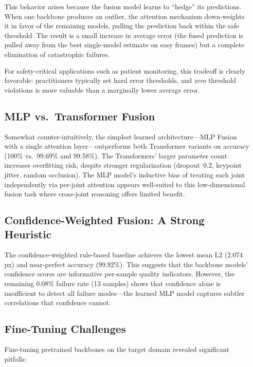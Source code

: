\documentclass[11pt,a4paper]{article}
\begin{document}
This behavior arises because the fusion model learns to ``hedge'' its
predictions.  When one backbone produces an outlier, the attention mechanism
down-weights it in favor of the remaining models, pulling the prediction back
within the safe threshold.  The result is a small increase in average error
(the fused prediction is pulled away from the best single-model estimate on
easy frames) but a complete elimination of catastrophic failures.

For safety-critical applications such as patient monitoring, this tradeoff is
clearly favorable: practitioners typically set hard error thresholds, and
\emph{zero} threshold violations is more valuable than a marginally lower
average error.

\subsection{MLP vs.\ Transformer Fusion}

Somewhat counter-intuitively, the simplest learned architecture---MLP
Fusion with a single attention layer---outperforms both Transformer variants
on accuracy (100\% vs.\ 99.69\% and 99.58\%).  The Transformers' larger
parameter count increases overfitting risk, despite stronger regularization
(dropout~0.2, keypoint jitter, random occlusion).  The MLP model's inductive
bias of treating each joint independently via per-joint attention appears
well-suited to this low-dimensional fusion task where cross-joint reasoning
offers limited benefit.

\subsection{Confidence-Weighted Fusion: A Strong Heuristic}

The confidence-weighted rule-based baseline achieves the lowest mean L2
(2.074\,px) and near-perfect accuracy (99.92\%).  This suggests that the
backbone models' confidence scores are informative per-sample quality
indicators.  However, the remaining 0.08\% failure rate (13 samples) shows
that confidence alone is insufficient to detect all failure modes---the
learned MLP model captures subtler correlations that confidence cannot.

\subsection{Fine-Tuning Challenges}

Fine-tuning pretrained backbones on the target domain revealed significant
pitfalls:
\end{document}
